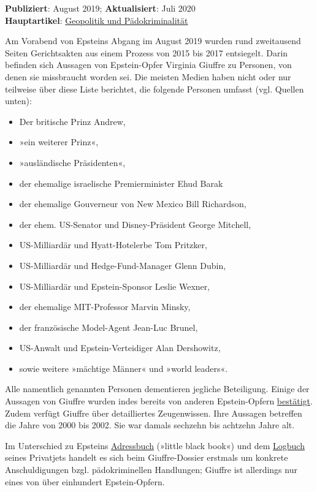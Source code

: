 \textbf{Publiziert}: August 2019; \textbf{Aktualisiert}: Juli 2020\\
\textbf{Hauptartikel}:
\href{https://swprs.org/geopolitik-und-paedokriminalitaet/}{Geopolitik
und Pädokriminalität}

Am Vorabend von Epsteins Abgang im August 2019 wurden rund zweitausend
Seiten Gerichts­akten aus einem Prozess von 2015 bis 2017 entsiegelt.
Darin befinden sich Aussagen von Epstein-Opfer Virginia Giuffre zu
Personen, von denen sie missbraucht worden sei. Die meisten Medien haben
nicht oder nur teilweise über diese Liste berichtet, die folgende
Personen umfasst (vgl. Quellen unten):

\begin{itemize}
\tightlist
\item
  Der britische Prinz Andrew,
\item
  »ein weiterer Prinz«,
\item
  »ausländische Präsidenten«,
\item
  der ehemalige israelische Premierminister Ehud Barak
\item
  der ehemalige Gouverneur von New Mexico Bill Richardson,
\item
  der ehem. US-Senator und Disney-Präsident George Mitchell,
\item
  US-Milliardär und Hyatt-Hotelerbe Tom Pritzker,
\item
  US-Milliardär und Hedge-Fund-Manager Glenn Dubin,
\item
  US-Milliardär und Epstein-Sponsor Leslie Wexner,
\item
  der ehemalige MIT-Professor Marvin Minsky,
\item
  der französische Model-Agent Jean-Luc Brunel,
\item
  US-Anwalt und Epstein-Verteidiger Alan Dershowitz,
\item
  sowie weitere »mächtige Männer« und »world leaders«.
\end{itemize}

Alle namentlich genannten Personen dementieren jegliche Beteiligung.
Einige der Aussagen von Giuffre wurden indes bereits von anderen
Epstein-Opfern
\href{https://www.insider.com/jeffrey-epstein-accuser-prince-andrew-puppet-2019-8}{bestätigt}.
Zudem verfügt Giuffre über detailliertes Zeugenwissen. Ihre Aussagen
betreffen die Jahre von 2000 bis 2002. Sie war damals sechzehn bis
achtzehn Jahre alt.

Im Unterschied zu Epsteins
\href{https://gawker.com/here-is-pedophile-billionaire-jeffrey-epsteins-little-b-1681383992}{Adressbuch}
(»little black book«) und dem
\href{https://gawker.com/flight-logs-put-clinton-dershowitz-on-pedophile-billio-1681039971}{Logbuch}
seines Privatjets handelt es sich beim Giuffre-Dossier erstmals um
konkrete Anschuldigungen bzgl. pädo­krimi­nellen Handlungen; Giuffre ist
allerdings nur eines von über einhundert Epstein-Opfern.

